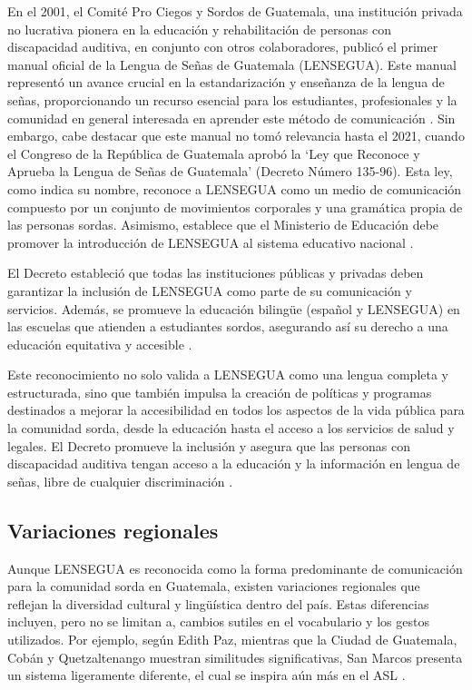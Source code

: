 En el 2001, el Comité Pro Ciegos y Sordos de Guatemala, una institución privada no lucrativa pionera en la educación y rehabilitación de personas con discapacidad auditiva, en conjunto con otros colaboradores, publicó el primer manual oficial de la Lengua de Señas de Guatemala (LENSEGUA). Este manual representó un avance crucial en la estandarización y enseñanza de la lengua de señas, proporcionando un recurso esencial para los estudiantes, profesionales y la comunidad en general interesada en aprender este método de comunicación \cite{deLeon2021}. Sin embargo, cabe destacar que este manual no tomó relevancia hasta el 2021, cuando el Congreso de la República de Guatemala aprobó la ‘Ley que Reconoce y Aprueba la Lengua de Señas de Guatemala’ (Decreto Número 135-96). Esta ley, como indica su nombre, reconoce a LENSEGUA como un medio de comunicación compuesto por un conjunto de movimientos corporales y una gramática propia de las personas sordas. Asimismo, establece que el Ministerio de Educación debe promover la introducción de LENSEGUA al sistema educativo nacional \cite{two}.

El Decreto estableció que todas las instituciones públicas y privadas deben garantizar la inclusión de LENSEGUA como parte de su comunicación y servicios. Además, se promueve la educación bilingüe (español y LENSEGUA) en las escuelas que atienden a estudiantes sordos, asegurando así su derecho a una educación equitativa y accesible \cite{CongresoGuatemala2020}.

Este reconocimiento no solo valida a LENSEGUA como una lengua completa y estructurada, sino que también impulsa la creación de políticas y programas destinados a mejorar la accesibilidad en todos los aspectos de la vida pública para la comunidad sorda, desde la educación hasta el acceso a los servicios de salud y legales. El Decreto promueve la inclusión y asegura que las personas con discapacidad auditiva tengan acceso a la educación y la información en lengua de señas, libre de cualquier discriminación \cite{CongresoGuatemala2020}.


\subsection{Variaciones regionales}

Aunque LENSEGUA es reconocida como la forma predominante de comunicación para la comunidad sorda en Guatemala, existen variaciones regionales que reflejan la diversidad cultural y lingüística dentro del país. Estas diferencias incluyen, pero no se limitan a, cambios sutiles en el vocabulario y los gestos utilizados. Por ejemplo, según Edith Paz, mientras que la Ciudad de Guatemala, Cobán y Quetzaltenango muestran similitudes significativas, San Marcos presenta un sistema ligeramente diferente, el cual se inspira aún más en el ASL \cite{four}.


